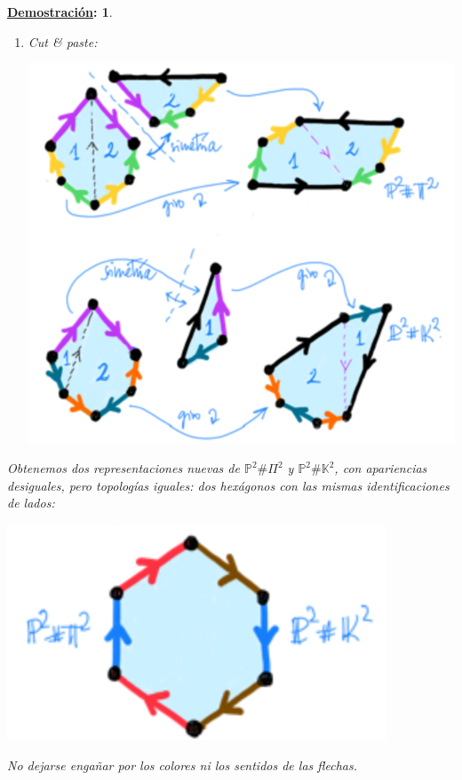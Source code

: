 \documentclass[10pt,a4paper,openright]{book}
\theoremstyle{break}
\newtheorem*{demo}{\underline{Demostración}:}
\begin{document}
\begin{demo}
\begin{enumerate}
        \item \textit{Cut \& paste}:
        \begin{center}
            \includegraphics[scale=0.3]{images/rel_fund_c&p} 
        \end{center}
    \end{enumerate}
    Obtenemos dos representaciones nuevas de $\mathbb{P}^{2} \# \Pi^2$ y $\mathbb{P}^{2} \# \mathbb{K}^2$, con apariencias desiguales, pero topologías iguales: dos hexágonos con las mismas identificaciones de lados:
    \begin{center}
        \includegraphics[scale=0.3]{images/rel_fund_hex} 
    \end{center}
    No dejarse engañar por los colores ni los sentidos de las flechas.
\end{demo}
\end{document}
